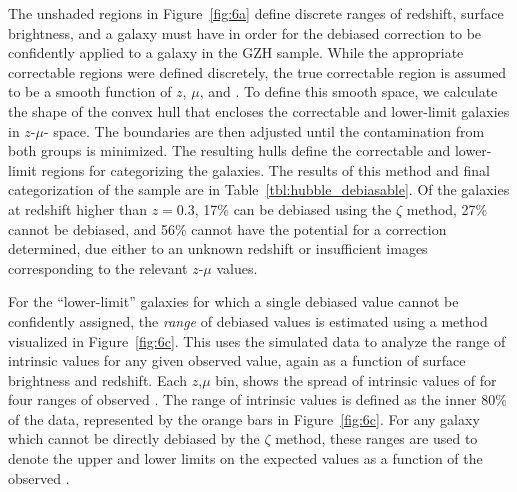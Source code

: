 \documentclass[twocolumn]{aastex6}
\begin{document}
The unshaded regions in Figure~\ref{fig:6a} define discrete ranges of redshift,
surface brightness, and \ffeatures{} a galaxy must have in order for the
debiased correction to be confidently applied to a galaxy in the GZH sample.
While the appropriate correctable regions were defined discretely, the true
correctable region is assumed to be a smooth function of $z$, $\mu$, and
\ffeatures{}. To define this smooth space, we calculate the shape of the convex
hull that encloses the correctable and lower-limit \ferengi{} galaxies in
$z$-$\mu$-\ffeatures{} space. The boundaries are then adjusted until the
contamination from both groups is minimized. The resulting hulls define the
correctable and lower-limit regions for categorizing the \hst{} galaxies. The
results of this method and final categorization of the \hst{} sample are in
Table~\ref{tbl:hubble_debiasable}. Of the galaxies at redshift higher than
$z=0.3$, 17\% can be debiased using the $\zeta$ method, 27\% cannot be
debiased, and 56\% cannot have the potential for a correction determined, due
either to an unknown redshift or insufficient \ferengi{} images corresponding
to the relevant $z$-$\mu$ values.

For the ``lower-limit'' galaxies for which a single debiased \ffeatures{} value
cannot be confidently assigned, the \emph{range} of debiased values is
estimated using a method visualized in Figure~\ref{fig:6c}. This uses the
\ferengi{} simulated data to analyze the range of intrinsic \ffeaturesrest{}
values for any given observed \ffeatures{} value, again as a function of
surface brightness and redshift. Each $z$,$\mu$ bin, shows the spread of
intrinsic values of \ffeaturesrest{} for four ranges of observed \ffeatures.
The range of intrinsic values is defined as the inner 80\% of the data,
represented by the orange bars in Figure~\ref{fig:6c}. For any galaxy which
cannot be directly debiased by the $\zeta$ method, these ranges are used to
denote the upper and lower limits on the expected values \ffeaturesrest{} as a
function of the observed \ffeatures. 
\end{document}
